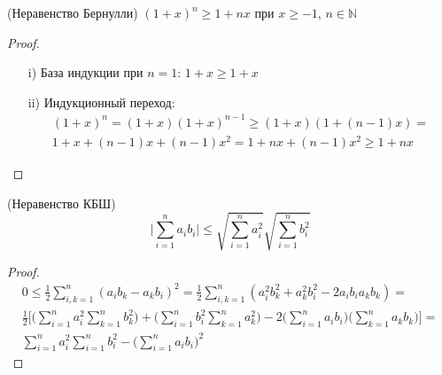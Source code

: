 \begin{theorem}(Неравенство Бернулли)
    $(1 + x)^n \geqslant 1 + nx$ при $x \geqslant -1$, $n \in \mathbb{N}$
\end{theorem}
\begin{proof}
    \enewline
    \begin{itemize}
        \item[i)] База индукции при $n = 1$: $1 + x \geqslant 1 + x$
        \item[ii)] Индукционный переход:
        \begin{align*}
            (1 + x)^n = (1 + x)(1 + x)^{n-1} \geqslant (1 + x)(1 + (n - 1)x) = \\
            1 + x + (n - 1)x + (n - 1)x^2 = 1 + nx + (n - 1)x^2 \geqslant 1 + nx
        \end{align*}
    \end{itemize}
\end{proof}

\begin{theorem}(Неравенство КБШ)
\[
    \Bigg|\sum_{i=1}^{n}{a_i b_i}\Bigg| \leqslant \sqrt{\sum_{i=1}^{n}{a_i^2}}\sqrt{\sum_{i=1}^{n}{b_i^2}}
\]
\end{theorem}
\begin{proof}
    \begin{align*}
        0 \leqslant \frac{1}{2}\sum_{i,k=1}^{n}{(a_i b_k - a_k b_i)^2} =
        \frac{1}{2}\sum_{i,k=1}^{n}{(a_i^2 b_k^2 + a_k^2 b_i^2 - 2a_i b_i a_k
        b_k)} = \\ \frac{1}{2}\Bigg[ \Big(\sum_{i=1}^{n}{a_i^2}
        \sum_{k=1}^{n}{b_k^2} \Big) + \Big(\sum_{i=1}^{n}{b_i^2}
        \sum_{k=1}^{n}{a_k^2} \Big) - 2\Big(\sum_{i=1}^{n}{a_i b_i} \Big)\Big(
        \sum_{k=1}^{n}{a_k b_k}\Big) \Bigg] = \\
        \sum_{i=1}^{n}{a_i^2}\sum_{i=1}^{n}{b_i^2} -
        \Big(\sum_{i=1}^{n}{a_i b_i} \Big)^2
    \end{align*}
\end{proof}

\newpage
